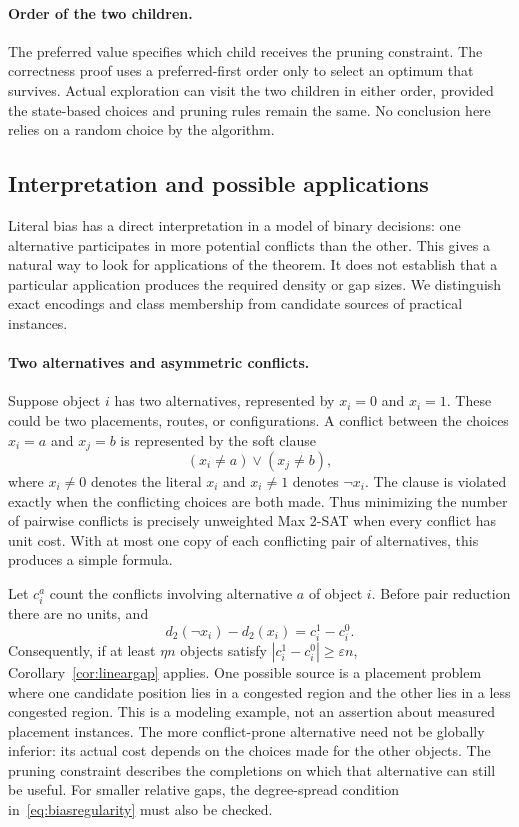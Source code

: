 \documentclass[11pt,a4paper]{article}
\theoremstyle{definition}
\theoremstyle{remark}
\begin{document}
\paragraph{Order of the two children.}
The preferred value specifies which child receives the pruning constraint.
The correctness proof uses a preferred-first order only to select an
optimum that survives. Actual exploration can visit the two children in
either order, provided the state-based choices and pruning rules remain
the same. No conclusion here relies on a random choice by the algorithm.


\subsection{Interpretation and possible applications}\label{sec:applications}

Literal bias has a direct interpretation in a model of binary decisions:
one alternative participates in more potential conflicts than the other.
This gives a natural way to look for applications of the theorem. It does
not establish that a particular application produces the required density
or gap sizes. We distinguish exact encodings and class membership from
candidate sources of practical instances.

\paragraph{Two alternatives and asymmetric conflicts.}
Suppose object $i$ has two alternatives, represented by $x_i=0$ and $x_i=1$.
These could be two placements, routes, or configurations. A conflict between
the choices $x_i=a$ and $x_j=b$ is represented by the soft clause
\[
 (x_i\ne a)\vee(x_j\ne b),
\]
where $x_i\ne0$ denotes the literal $x_i$ and $x_i\ne1$ denotes $\neg x_i$.
The clause is violated exactly when the conflicting choices are both made.
Thus minimizing the number of pairwise conflicts is precisely unweighted
Max 2-SAT when every conflict has unit cost. With at most one copy of each
conflicting pair of alternatives, this produces a simple formula.

Let $c_i^a$ count the conflicts involving alternative $a$ of object $i$.
Before pair reduction there are no units, and
\[
 d_2(\neg x_i)-d_2(x_i)=c_i^1-c_i^0.
\]
Consequently, if at least $\eta n$ objects satisfy
$|c_i^1-c_i^0|\ge\varepsilon n$, Corollary~\ref{cor:lineargap} applies.
One possible source is a placement problem where one candidate position
lies in a congested region and the other lies in a less congested region.
This is a modeling example, not an assertion about measured placement
instances. The more conflict-prone alternative need not be globally
inferior: its actual cost depends on the choices made for the other objects.
The pruning constraint describes the completions on which that alternative
can still be useful. For smaller relative gaps, the degree-spread condition
in~\eqref{eq:biasregularity} must also be checked.
\end{document}
